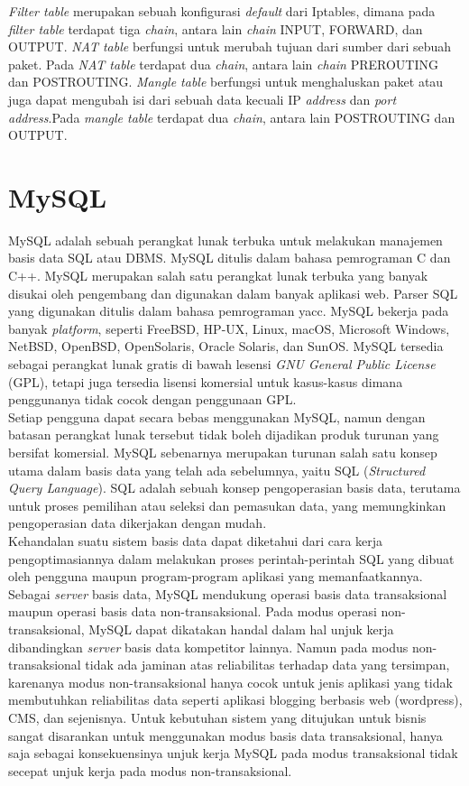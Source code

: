 \textit{Filter table} merupakan sebuah konfigurasi \textit{default} dari Iptables, dimana pada \textit{filter table} terdapat tiga \textit{chain}, antara lain \textit{chain} INPUT, FORWARD, dan OUTPUT. \textit{NAT table} berfungsi untuk merubah tujuan dari sumber dari sebuah paket. Pada \textit{NAT table} terdapat dua \textit{chain}, antara lain \textit{chain} PREROUTING dan POSTROUTING. \textit{Mangle table} berfungsi untuk menghaluskan paket atau juga dapat mengubah isi dari sebuah data kecuali IP \textit{address} dan \textit{port address}.Pada \textit{mangle table} terdapat dua \textit{chain}, antara lain POSTROUTING dan OUTPUT.

\section{MySQL}
MySQL adalah sebuah perangkat lunak terbuka untuk melakukan manajemen basis data SQL atau DBMS. MySQL ditulis dalam bahasa pemrograman C dan C++. MySQL merupakan salah satu perangkat lunak terbuka yang banyak disukai oleh pengembang dan digunakan dalam banyak aplikasi web. Parser SQL yang digunakan ditulis dalam bahasa pemrograman yacc. MySQL bekerja pada banyak \textit{platform}, seperti  FreeBSD, HP-UX, Linux, macOS, Microsoft Windows, NetBSD, OpenBSD, OpenSolaris, Oracle Solaris, dan SunOS. MySQL tersedia sebagai perangkat lunak gratis di bawah lesensi \textit{GNU General Public License} (GPL), tetapi juga tersedia lisensi komersial untuk kasus-kasus dimana penggunanya tidak cocok dengan penggunaan GPL. \cite{bab2-mysql}\\
\indent Setiap pengguna dapat secara bebas menggunakan MySQL, namun dengan batasan perangkat lunak tersebut tidak boleh dijadikan produk turunan yang bersifat komersial. MySQL sebenarnya merupakan turunan salah satu konsep utama dalam basis data yang telah ada sebelumnya, yaitu SQL (\textit{Structured Query Language}). SQL adalah sebuah konsep pengoperasian basis data, terutama untuk proses pemilihan atau seleksi dan pemasukan data, yang memungkinkan pengoperasian data dikerjakan dengan mudah.\\
\indent Kehandalan suatu sistem basis data dapat diketahui dari cara kerja pengoptimasiannya dalam melakukan proses perintah-perintah SQL yang dibuat oleh pengguna maupun program-program aplikasi yang memanfaatkannya. Sebagai \textit{server} basis data, MySQL mendukung operasi basis data transaksional maupun operasi basis data non-transaksional. Pada modus operasi non-transaksional, MySQL dapat dikatakan handal dalam hal unjuk kerja dibandingkan \textit{server} basis data kompetitor lainnya. Namun pada modus non-transaksional tidak ada jaminan atas reliabilitas terhadap data yang tersimpan, karenanya modus non-transaksional hanya cocok untuk jenis aplikasi yang tidak membutuhkan reliabilitas data seperti aplikasi blogging berbasis web (wordpress), CMS, dan sejenisnya. Untuk kebutuhan sistem yang ditujukan untuk bisnis sangat disarankan untuk menggunakan modus basis data transaksional, hanya saja sebagai konsekuensinya unjuk kerja MySQL pada modus transaksional tidak secepat unjuk kerja pada modus non-transaksional.

